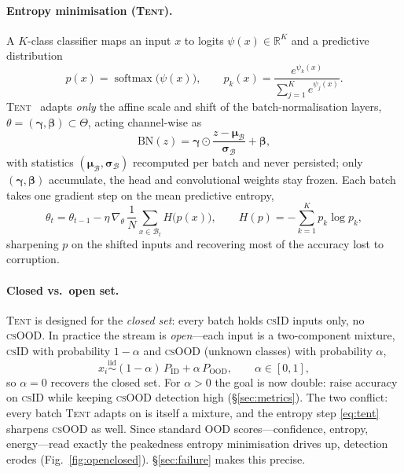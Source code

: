 \documentclass[11pt]{article}
\newcommand{\csid}{\textsc{cs}ID}
\newcommand{\csood}{\textsc{cs}OOD}
\newcommand{\method}[1]{\textsc{#1}}
\newcommand{\R}{\mathbb{R}}
\DeclareMathOperator{\softmax}{softmax}
\begin{document}
\paragraph{Entropy minimisation (\method{Tent}).} A $K$-class
classifier maps an input $x$ to logits $\psi(x)\in\R^K$ and a predictive
distribution
\begin{equation}\label{eq:softmax}
p(x)=\softmax\big(\psi(x)\big),
\qquad
p_{k}(x)=\frac{e^{\psi_k(x)}}{\sum_{j=1}^{K}e^{\psi_j(x)}} .
\end{equation}
\method{Tent}~\cite{tent} adapts \emph{only} the affine scale and shift
of the batch-normalisation layers,
$\theta=(\bm{\gamma},\bm{\beta})\subset\Theta$, acting channel-wise as
\begin{equation}\label{eq:bn}
\mathrm{BN}(z)=\bm{\gamma}\odot
\frac{z-\bm{\mu}_{\mathcal{B}}}{\bm{\sigma}_{\mathcal{B}}}+\bm{\beta},
\end{equation}
with statistics $(\bm{\mu}_{\mathcal{B}},\bm{\sigma}_{\mathcal{B}})$
recomputed per batch and never persisted; only $(\bm{\gamma},\bm{\beta})$
accumulate, the head and convolutional weights stay frozen. Each batch
takes one gradient step on the mean predictive entropy,
\begin{equation}\label{eq:tent}
\theta_t=\theta_{t-1}-\eta\,\nabla_{\theta}\,
\frac{1}{N}\sum_{x\in\mathcal{B}_t}H\big(p(x)\big),
\qquad
H(p)=-\sum_{k=1}^{K}p_k\log p_k,
\end{equation}
sharpening $p$ on the shifted inputs and recovering most of the accuracy
lost to corruption.

\paragraph{Closed vs.\ open set.} \method{Tent} is designed for the
\emph{closed set}: every batch holds \csid{} inputs only, no \csood. In
practice the stream is \emph{open}---each input is a two-component
mixture, \csid{} with probability $1-\alpha$ and \csood{} (unknown
classes) with probability $\alpha$,
\begin{equation}\label{eq:mixture}
x_i\overset{\text{iid}}{\sim}(1-\alpha)\,P_{\mathrm{ID}}
+\alpha\,P_{\mathrm{OOD}},
\qquad \alpha\in[0,1],
\end{equation}
so $\alpha=0$ recovers the closed set. For $\alpha>0$ the goal is now
double: raise accuracy on \csid{} while keeping \csood{} detection high
(\S\ref{sec:metrics}). The two conflict: every batch \method{Tent} adapts
on is itself a mixture, and the entropy step \eqref{eq:tent} sharpens
\csood{} as well. Since standard OOD scores---confidence, entropy,
energy---read exactly the peakedness entropy minimisation drives up,
detection erodes (Fig.~\ref{fig:openclosed}). \S\ref{sec:failure} makes
this precise.
\end{document}

